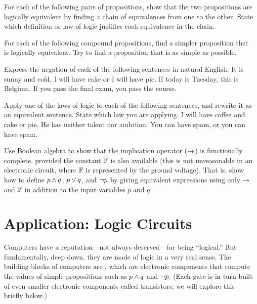 \begin{exercises}
\problem For each of the following pairs of propositions, show that
the two propositions are logically equivalent by finding a chain of
equivalences from one to the other.
State which definition or law of logic justifies each equivalence in the chain.

\problem For each of the following compound propositions, find a 
simpler proposition that is logically equivalent.  Try to find a proposition
that is as simple as possible.

\problem Express the negation of each of the following sentences in
natural English:
\ppart It is sunny and cold.
\ppart I will have cake or I will have pie.
\ppart If today is Tuesday, this is Belgium.
\ppart If you pass the final exam, you pass the course.

\problem Apply one of the laws of logic to each of the
following sentences, and rewrite it as an equivalent sentence.
State which law you are applying.
\ppart I will have coffee and cake or pie.
\ppart He has neither talent nor ambition.
\ppart You can have spam, or you can have spam.

\problem Use Boolean algebra to show that the implication operator ($\rightarrow$) is functionally complete, provided the constant $\mathbb{F}$ is also available (this is not unreasonable in an electronic circuit, where $\mathbb{F}$ is represented by the ground voltage). That is, show how to define $p\wedge q$, $p\vee q$, and $\lnot p$ by giving equivalent expressions using only $\rightarrow$ and $\mathbb{F}$ in addition to the input variables $p$ and $q$.

\end{exercises}





\section{Application: Logic Circuits}\label{S-logic-3}

Computers have a reputation---not always deserved---for being ``logical.''
But fundamentally, deep down, they are made of logic in a very real
sense.  The building blocks of computers are ,
which are electronic components that compute the values of simple
propositions such as $p\wedge q$ and $\lnot p$.  (Each gate is in turn
built of even smaller electronic components called transistors; we will
explore this briefly below.)


